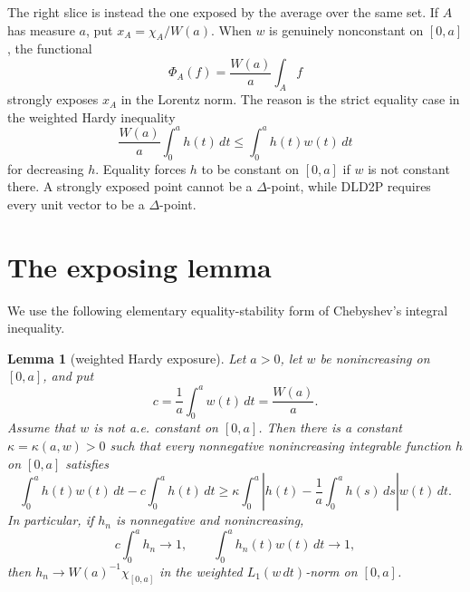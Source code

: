 \documentclass[11pt]{article}
\newtheorem{lemma}{Lemma}
\begin{document}
The right slice is instead the one exposed by the average over the same set.
If \(A\) has measure \(a\), put \(x_A=\chi_A/W(a)\).  When \(w\) is genuinely
nonconstant on \([0,a]\), the functional
\[
  \Phi_A(f)=\frac{W(a)}{a}\int_A f
\]
strongly exposes \(x_A\) in the Lorentz norm.  The reason is the strict
equality case in the weighted Hardy inequality
\[
  \frac{W(a)}a\int_0^a h(t)\,dt
  \leq
  \int_0^a h(t)w(t)\,dt
\]
for decreasing \(h\).  Equality forces \(h\) to be constant on \([0,a]\) if
\(w\) is not constant there.  A strongly exposed point cannot be a
\(\Delta\)-point, while DLD2P requires every unit vector to be a
\(\Delta\)-point.

\section*{The exposing lemma}

We use the following elementary equality-stability form of Chebyshev's
integral inequality.

\begin{lemma}[weighted Hardy exposure]\label{lem:exposure}
Let \(a>0\), let \(w\) be nonincreasing on \([0,a]\), and put
\[
  c=\frac1a\int_0^a w(t)\,dt=\frac{W(a)}a.
\]
Assume that \(w\) is not a.e. constant on \([0,a]\).  Then there is a
constant \(\kappa=\kappa(a,w)>0\) such that every nonnegative nonincreasing
integrable function \(h\) on \([0,a]\) satisfies
\[
  \int_0^a h(t)w(t)\,dt
  -c\int_0^a h(t)\,dt
  \geq
  \kappa\int_0^a \left|h(t)-\frac1a\int_0^a h(s)\,ds\right|w(t)\,dt .
\]
In particular, if \(h_n\) is nonnegative and nonincreasing,
\[
  c\int_0^a h_n\to1,\qquad
  \int_0^a h_n(t)w(t)\,dt\to1,
\]
then \(h_n\to W(a)^{-1}\chi_{[0,a]}\) in the weighted
\(L_1(w\,dt)\)-norm on \([0,a]\).
\end{lemma}
\end{document}
